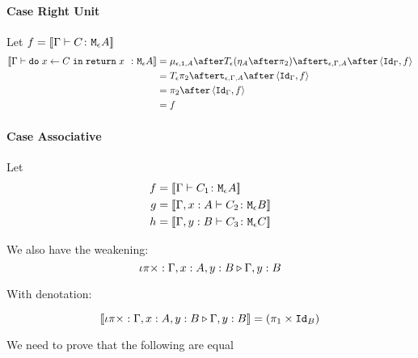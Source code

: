 {\paragraph{Case Right Unit}

Let $f = {\bf [\![}\Gamma \vdash C \colon \texttt{M}_{\epsilon}{A}{\bf ]\!]}$ 
    \begin{equation}
    \begin{split}
        \deno{\gtyperelation{\doin{x}{C}{\return{x}}}{\mea}}  & = \bind{\e}{\1}{A} \after \T{\e}{(\point{A} \after \pp)} \after \tstrength{\e}{\G}{A}\after \pr{\idg}{f} \\
        & = \T{\e}{\pp} \after \tstrength{\e}{\G}{A} \after \pr {\idg}{f} \\
        & = \pp \after \pr{\idg}{f}\\
        & = f
    \end{split}
\end{equation}



\paragraph{Case Associative}
Let
\begin{align}
    f ={}& {\bf [\![}\Gamma \vdash C_1 \colon \texttt{M}_{\epsilon}{A}{\bf ]\!]}\\
    g ={}& {\bf [\![}\Gamma, x: A \vdash C_2 \colon \texttt{M}_{\epsilon}{B}{\bf ]\!]}\\
    h ={}& {\bf [\![}\Gamma, y: B \vdash C_3 \colon \texttt{M}_{\epsilon}{C}{\bf ]\!]}
\end{align}

We also have the weakening:
\begin{equation}
    \iota\pi\times : \Gamma, x: A, y: B \triangleright \Gamma, y: B
\end{equation}

With denotation:

\begin{equation}
    {\bf [\![}\iota\pi\times : \Gamma, x: A, y: B \triangleright \Gamma, y: B{\bf ]\!]} = (\pi_1 \times \texttt{Id}_{B})
\end{equation}

We need to prove that the following are equal

}
